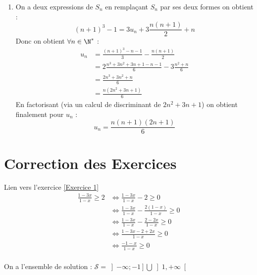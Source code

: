 \documentclass[12pt,fleqn]{report} %
\begin{document}
\begin{correction}
\begin{enumerate}
		\item On a deux expressions de $S_n$ en remplaçant $S_n$ par ses deux formes on obtient : 
		\[
		(n+1)^3 - 1 = 3 u_n + 3 \frac{n(n+1)}{2} + n
		\]
		Donc on obtient $\forall n \in \N^*$ : 
		\begin{align*}
		u_n & = \frac{(n+1)^3 - n - 1}{3} - \frac{n(n+1)}{2} \\
		& = 2\frac{n^3 + 3n^2 + 3n + 1 - n - 1}{6} - 3\frac{n^2 + n}{6} \\
		& = \frac{2n^3 + 3n^2 + n}{6} \\
		& = \frac{n(2n^2 + 3n + 1)}{6}
		\end{align*}
		En factorisant (via un calcul de discriminant de $2 n^2 + 3n + 1$) on obtient finalement pour $u_n$ : \[
		u_n = \frac{n(n+1)(2n+1)}{6}
		\]
	\end{enumerate}
\end{correction}





\chapter{Correction des Exercices}
\begin{correction}Lien vers l'exercice   \ref{Exercice 1}
	\begin{align*}
	\frac{1-3 x}{1 - x}\ge 2  & \iff \frac{1-3 x}{1 - x}-2\ge 0\\
	& \iff \frac{1 - 3 x}{1 - x}- \frac{2(1 - x)}{1 - x} \ge 0 \\
	& \iff \frac{1 - 3 x}{1 - x}- \frac{2 - 2x}{1 - x} \ge 0\\
	& \iff \frac{1 - 3 x-2 + 2x}{1 - x} \ge 0\\
	& \iff \frac{-1-x}{1-x} \ge 0\\
	\end{align*}
	\begin{center}
	\end{center}
	On a  l'ensemble de solution : $\mathcal{S} =\left]-\infty; -1 \right] \bigcup \left] 1, +\infty\right[$
\end{correction}
\end{document}
